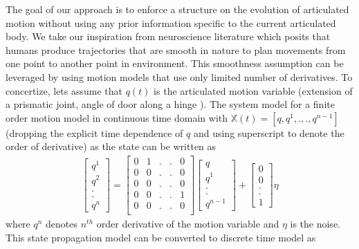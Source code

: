 \documentclass[conference]{IEEEtran}
\begin{document}
The goal of our approach is to enforce a structure on the evolution of articulated motion without using any prior information specific to the current articulated body. We take our inspiration from neuroscience literature which posits that humans produce trajectories that are smooth in nature \cite{flash1985coordination} to plan movements from one point to another point in environment. This smoothness assumption can be leveraged by using motion models that use only limited number of derivatives. To concertize, lets assume that $q(t)$ is the articulated motion variable (extension of a prismatic joint, angle of door along a hinge ). The system model for a finite order motion model in continuous time domain with $\mathbb{X}(t) = [q,q^{1},.,.,q^{n-1}]$ (dropping the explicit time dependence of $q$ and using superscript to denote the order of derivative) as the state can be written as
\begin{align}
\begin{bmatrix}
q^{1} \\
q^{2} \\
. \\
.\\
q^{n}
\end{bmatrix} = 
\begin{bmatrix}
0 & 1  & . & . & 0\\
0 & 0  & . & . & 0\\
0 & 0  & . & . & 0\\
0& 0 & . & . & 1\\
0 & 0  & . & . & 0\\
\end{bmatrix}
\begin{bmatrix}
q \\
q^{1} \\
. \\
.\\
q^{n-1}
\end{bmatrix}
+\begin{bmatrix}
0 \\
0 \\
.\\
.\\
1
\end{bmatrix} \eta
\end{align}
where $q^{n}$ denotes $n^{th}$ order derivative of the motion variable and $\eta$ is the noise. This state propagation model can be converted to discrete time model as 
\end{document}

